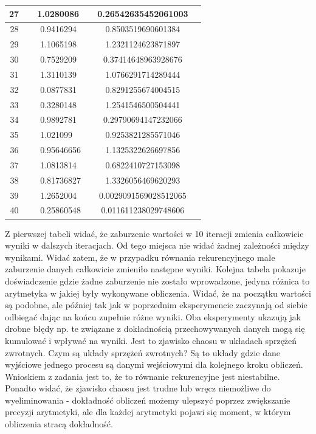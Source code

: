 \documentclass[]{article}
\begin{document}
\begin{table}[!h]
\begin{tabular}{|c|c|c|c|}
			27 & 1.0280086  		& 0.26542635452061003 \\ \hline
			28 & 0.9416294  		& 0.8503519690601384 \\ \hline
			29 & 1.1065198  		& 1.2321124623871897 \\ \hline
			30 & 0.7529209  		& 0.37414648963928676 \\ \hline
			31 & 1.3110139  		& 1.0766291714289444 \\ \hline
			32 & 0.0877831  		& 0.8291255674004515 \\ \hline
			33 & 0.3280148  		& 1.2541546500504441 \\ \hline
			34 & 0.9892781  		& 0.29790694147232066 \\ \hline
			35 & 1.021099   		& 0.9253821285571046 \\ \hline
			36 & 0.95646656 		& 1.1325322626697856 \\ \hline
			37 & 1.0813814  		& 0.6822410727153098 \\ \hline
			38 & 0.81736827 		& 1.3326056469620293 \\ \hline
			39 & 1.2652004  		& 0.0029091569028512065 \\ \hline
			40 & 0.25860548 		& 0.011611238029748606 \\ \hline
		\end{tabular}
	\end{table}

	Z pierwszej tabeli widać, że zaburzenie wartości w 10 iteracji zmienia całkowicie wyniki w dalszych iteracjach. Od tego miejsca nie widać żadnej zależności między wynikami. Widać zatem, że w przypadku równania rekurencyjnego małe zaburzenie danych całkowicie zmieniło następne wyniki. Kolejna tabela pokazuje doświadczenie gdzie żadne zaburzenie nie zostało wprowadzone, jedyna różnica to arytmetyka w jakiej były wykonywane obliczenia. Widać, że na początku wartości są podobne, ale później tak jak w poprzednim eksperymencie zaczynają od siebie odbiegać dając na końcu zupełnie różne wyniki. Oba eksperymenty ukazują jak drobne błędy np. te związane z dokładnością przechowywanych danych mogą się kumulować i wpływać na wyniki. 
	Jest to zjawisko chaosu w układach sprzężeń zwrotnych. Czym są układy sprzężeń zwrotnych? Są to układy gdzie dane wyjściowe jednego procesu są danymi wejściowymi dla kolejnego kroku obliczeń. Wnioskiem z zadania jest to, że to równanie rekurencyjne jest niestabilne. Ponadto widać, że zjawisko chaosu jest trudne lub wręcz niemożliwe do wyeliminowania - dokładność obliczeń możemy ulepszyć poprzez zwiększanie precyzji arytmetyki, ale dla każdej arytmetyki pojawi się moment, w którym obliczenia stracą dokładność. 
	
\end{document}
